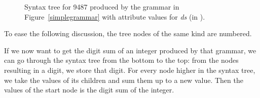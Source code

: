 \begin{figure}
\begin{center}
\end{center}
\caption{Syntax tree for 9487 produced by the grammar in Figure~\ref{simplegrammar} 
with attribute values for \emph{ds} (in \color{black}).\label{simpletree}}
\end{figure}
To ease the following discussion, the tree nodes of the same kind are numbered.

If we now want to get the digit sum of an integer produced by that grammar, we can go through the syntax tree from the bottom to the top:
from the nodes resulting in a digit, 
we store that digit. For every node higher in the syntax tree, we take the values of its children and sum them up to a new value. 
Then the values of the start node is the digit sum of 
the integer. 

